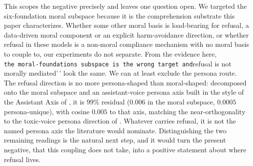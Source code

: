 This scopes the negative precisely and leaves one question open. We targeted the
six-foundation moral subspace because it is the comprehension substrate this paper
characterizes. Whether some other moral basis is load-bearing for refusal, a
data-driven moral component or an explicit harm-avoidance direction, or whether
refusal in these models is a non-moral compliance mechanism with no moral basis to
couple to, our experiments do not separate. From the evidence here, \texttt{the\ moral-foundations\ subspace\ is\ the\ wrong\ target\textquotesingle{}\textquotesingle{}\ and}refusal is not morally
mediated'\,' look the same. We can at least exclude the persona route. The refusal
direction is no more persona-shaped than moral-shaped: decomposed onto the moral
subspace and an assistant-voice persona axis built in the style of the Assistant
Axis of \citet{lu2026assistant}, it is \(99\%\) residual (\(0.006\) in the moral
subspace, \(0.0005\) persona-unique), with cosine \(0.005\) to that axis, matching the
near-orthogonality to the toxic-voice persona direction of \citet{wang2025persona}.
Whatever carries refusal, it is not the named persona axis the literature would
nominate. Distinguishing the two remaining readings is the natural next step, and it
would turn the present negative, that this coupling does not take, into a positive
statement about where refusal lives.
